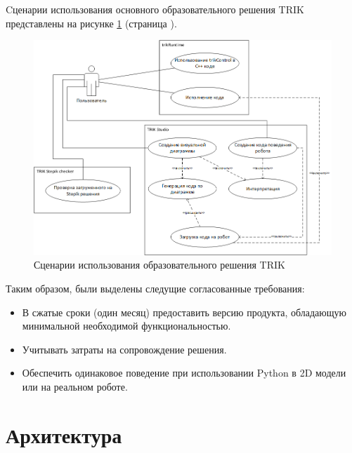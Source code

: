 \documentclass[14pt]{matmex-diploma-custom}
\begin{document}
Cценарии использования основного образовательного решения TRIK представлены на рисунке \ref{usecases} (страница \pageref{usecases}).

\begin{figure}[h]
	\includegraphics[width=\textwidth]{images/diploma-usecase.png}
	\caption{Сценарии использования образовательного решения TRIK}
	\label{usecases}
\end{figure}

Таким образом, были выделены следущие согласованные требования:
\begin{itemize}
    \item В сжатые сроки (один месяц) предоставить версию продукта, обладающую минимальной необходимой функциональностью.
    \item Учитывать затраты на сопровождение решения.
    \item Обеспечить одинаковое поведение при использовании Python в 2D модели или на реальном роботе.
\end{itemize}

\section{Архитектура}
\end{document}
